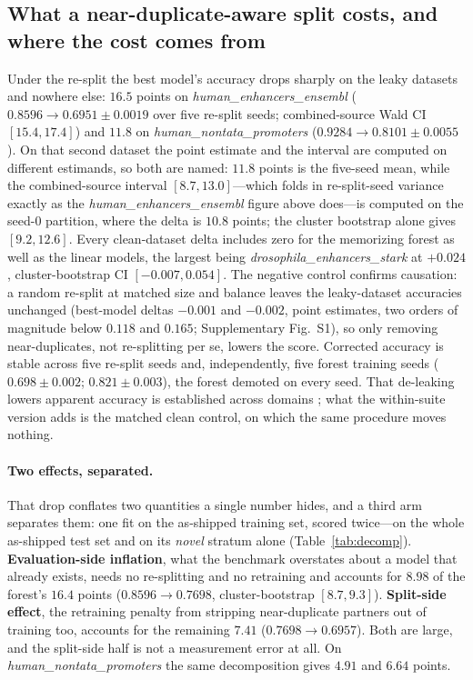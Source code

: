 \documentclass[webpdf,modern,large,namedate]{oup-authoring-template}%
\begin{document}
\subsection{What a near-duplicate-aware split costs, and where the cost comes from}\label{sec:r-drop}
Under the re-split the best model's accuracy drops sharply on the leaky datasets and nowhere else: $16.5$ points on \textit{human\_enhancers\_ensembl} ($0.8596\to0.6951\pm0.0019$ over five re-split seeds; combined-source Wald CI $[15.4,17.4]$) and $11.8$ on \textit{human\_nontata\_promoters} ($0.9284\to0.8101\pm0.0055$). On that second dataset the point estimate and the interval are computed on different estimands, so both are named: $11.8$ points is the five-seed mean, while the combined-source interval $[8.7,13.0]$---which folds in re-split-seed variance exactly as the \textit{human\_enhancers\_ensembl} figure above does---is computed on the seed-$0$ partition, where the delta is $10.8$ points; the cluster bootstrap alone gives $[9.2,12.6]$. Every clean-dataset delta includes zero for the memorizing forest as well as the linear models, the largest being \textit{drosophila\_enhancers\_stark} at $+0.024$, cluster-bootstrap CI $[-0.007,0.054]$. The negative control confirms causation: a random re-split at matched size and balance leaves the leaky-dataset accuracies unchanged (best-model deltas $-0.001$ and $-0.002$, point estimates, two orders of magnitude below $0.118$ and $0.165$; Supplementary Fig.~S1), so only removing near-duplicates, not re-splitting per se, lowers the score. Corrected accuracy is stable across five re-split seeds and, independently, five forest training seeds ($0.698\pm0.002$; $0.821\pm0.003$), the forest demoted on every seed. That de-leaking lowers apparent accuracy is established across domains \citep{kapoor2023leakage,rafi2026,bushuiev2024}; what the within-suite version adds is the matched clean control, on which the same procedure moves nothing.

\paragraph{Two effects, separated.} That drop conflates two quantities a single number hides, and a third arm separates them: one fit on the as-shipped training set, scored twice---on the whole as-shipped test set and on its \emph{novel} stratum alone (Table~\ref{tab:decomp}). \textbf{Evaluation-side inflation}, what the benchmark overstates about a model that already exists, needs no re-splitting and no retraining and accounts for $8.98$ of the forest's $16.4$ points ($0.8596\to0.7698$, cluster-bootstrap $[8.7,9.3]$). \textbf{Split-side effect}, the retraining penalty from stripping near-duplicate partners out of training too, accounts for the remaining $7.41$ ($0.7698\to0.6957$). Both are large, and the split-side half is not a measurement error at all. On \textit{human\_nontata\_promoters} the same decomposition gives $4.91$ and $6.64$ points.
\end{document}
